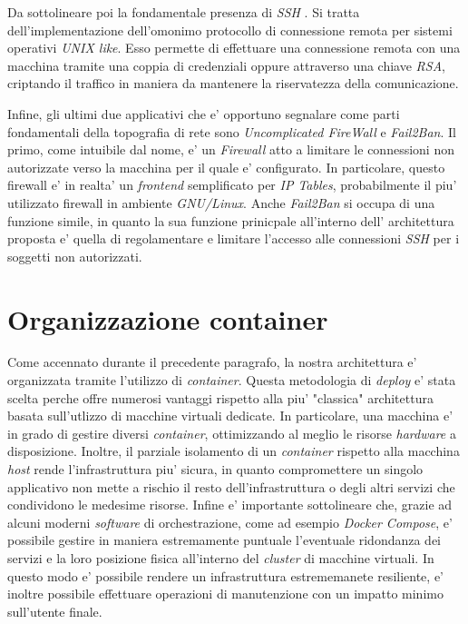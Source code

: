 \documentclass[a4paper]{report}
\begin{document}
		Da sottolineare poi la fondamentale presenza di \emph{SSH} \label{SSH}.  Si tratta dell'implementazione
		dell'omonimo protocollo di connessione remota per sistemi operativi \emph{UNIX like}. Esso permette di
		effettuare una connessione remota con una macchina tramite una coppia di credenziali oppure attraverso una chiave
		\emph{RSA}, criptando il traffico in maniera da mantenere la riservatezza della comunicazione.

		Infine, gli ultimi due applicativi che e' opportuno segnalare come parti fondamentali della topografia di rete
		sono \emph{Uncomplicated FireWall} e \emph{Fail2Ban}. Il primo, come intuibile dal nome, e' un \emph{Firewall}
		atto a limitare le connessioni non autorizzate verso la macchina per il quale e' configurato. In particolare,
		questo firewall e' in realta' un \emph{frontend} semplificato per \emph{IP Tables}, probabilmente il piu'
		utilizzato firewall in ambiente \emph{GNU/Linux}.
		Anche \emph{Fail2Ban} si occupa di una funzione simile, in quanto la sua funzione prinicpale all'interno dell'
		architettura proposta e' quella di regolamentare e limitare l'accesso alle connessioni \emph{SSH} per i soggetti
		non autorizzati.
 
	\section{Organizzazione container} \label{organizzazione_container}
		Come accennato durante il precedente paragrafo, la nostra architettura e' organizzata tramite l'utilizzo di
		\emph{container}. Questa metodologia di  \emph{deploy} e' stata scelta perche offre numerosi vantaggi rispetto
		alla piu' "classica" architettura basata sull'utlizzo di macchine virtuali dedicate. In particolare, una
		macchina e' in grado di gestire diversi \emph{container}, ottimizzando al meglio le risorse
		\emph{hardware} a disposizione. Inoltre, il parziale isolamento di un \emph{container} rispetto alla macchina
		\emph{host} rende l'infrastruttura piu' sicura, in quanto compromettere un singolo applicativo non mette a
		rischio il resto dell'infrastruttura o degli altri servizi che condividono le medesime risorse.
		Infine e' importante sottolineare che, grazie ad alcuni moderni \emph{software} di orchestrazione, come ad
		esempio \emph{Docker Compose}, e' possibile gestire in maniera estremamente puntuale l'eventuale ridondanza dei
		servizi e la loro posizione fisica all'interno del \emph{cluster} di macchine virtuali.
		In questo modo e' possibile rendere un infrastruttura estrememanete resiliente, e' inoltre possibile
		effettuare operazioni di manutenzione con un impatto minimo sull'utente finale.
\end{document}
